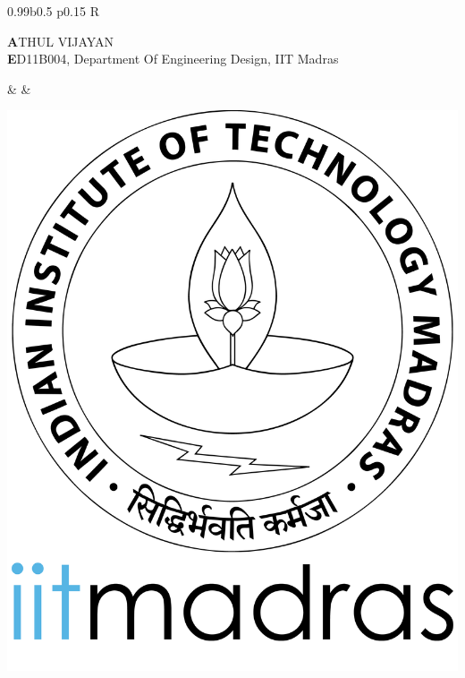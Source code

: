 \documentclass[a4paper,10pt]{article}
\begin{document}

\indent
\begin{tabularx}{0.99\textwidth}{b{} p{} R}
    \specialrule{.05em}{1em}{0em}
    \begin{minipage}{\textwidth}
    \vspace{30pt}
        {\fontsize{16pt}{1em}\selectfont \textbf ATHUL VIJAYAN}\\
        {\large \textbf ED11B004, Department Of Engineering Design, IIT Madras}
    \end{minipage} & &
    \begin{minipage}[l]{.1\textwidth}%
        \vspace{5pt}
        \includegraphics[width=\textwidth]{iitmlogo.png}
    \end{minipage}\\

\end{tabularx}
\end{document}
